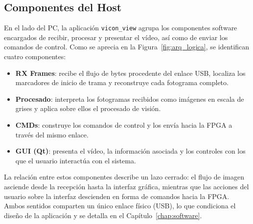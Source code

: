 \documentclass[../main.tex]{subfiles}
\begin{document}
\FloatBarrier
 
\subsection{Componentes del Host}
 
En el lado del PC, la aplicación \texttt{vicon\_view} agrupa los componentes software encargados de recibir, procesar y presentar el vídeo, así como de enviar los comandos de control. Como se aprecia en la Figura~\ref{fig:arq_logica}, se identifican cuatro componentes:
 
\begin{itemize}
    \item \textbf{RX Frames}: recibe el flujo de bytes procedente del enlace USB, localiza los marcadores de inicio de trama y reconstruye cada fotograma completo.
    \item \textbf{Procesado}: interpreta los fotogramas recibidos como imágenes en escala de grises y aplica sobre ellos el procesado de visión.
    \item \textbf{CMDs}: construye los comandos de control y los envía hacia la FPGA a través del mismo enlace.
    \item \textbf{GUI (Qt)}: presenta el vídeo, la información asociada y los controles con los que el usuario interactúa con el sistema.
\end{itemize}
 
La relación entre estos componentes describe un lazo cerrado: el flujo de imagen asciende desde la recepción hasta la interfaz gráfica, mientras que las acciones del usuario sobre la interfaz descienden en forma de comandos hacia la FPGA. Ambos sentidos comparten un único enlace físico (USB), lo que condiciona el diseño de la aplicación y se detalla en el Capítulo~\ref{chap:software}.
\end{document}

